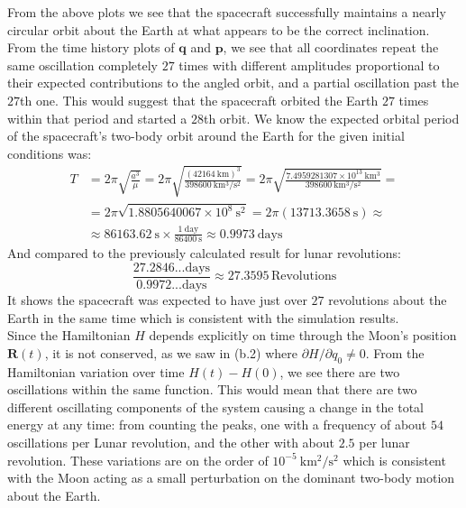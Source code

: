 \documentclass[titlepage]{article}
\begin{document}
\begin{mdframed}[linewidth=1pt, innertopmargin=10pt, innerbottommargin=10pt]
	From the above plots we see that the spacecraft successfully maintains a nearly circular orbit about the Earth at what appears to be the correct inclination. \\
	
	From the time history plots of $\boldsymbol{q}$ and $\boldsymbol{p}$, we see that all coordinates repeat the same oscillation completely $27$ times with different amplitudes proportional to their expected contributions to the angled orbit, and a partial oscillation past the $27$th one. This would suggest that the spacecraft orbited the Earth $27$ times within that period and started a $28$th orbit. We know the expected orbital period of the spacecraft's two-body orbit around the Earth for the given initial conditions was:
	\begin{equation}
		\begin{split}
			T&=2\pi\sqrt{\frac{a^3}{\mu}}=2\pi\sqrt{\frac{(42164\ \mathrm{km})^3}{398600\ \mathrm{km^3/s^2}}}=2\pi\sqrt{\frac{7.4959281307\times10^{13}\ \mathrm{km^3}}{398600\ \mathrm{km^3/s^2}}}= \\
			&=2\pi\sqrt{1.8805640067\times10^{8}\ \mathrm{s^2}}=2\pi\left(13713.3658\ \mathrm{s}\right)\approx \\
			&\approx86163.62\ \mathrm{s}\times\frac{1\ \mathrm{day}}{86400\ \mathrm{s}}\approx0.9973\ \mathrm{days}
		\end{split}
	\end{equation}
	And compared to the previously calculated result for lunar revolutions:
	\begin{equation}
		\frac{27.2846...\mathrm{days}}{0.9972...\mathrm{days}}\approx27.3595\,\mathrm{Revolutions}
	\end{equation}
	It shows the spacecraft was expected to have just over $27$ revolutions about the Earth in the same time which is consistent with the simulation results. \\
	
	Since the Hamiltonian $H$ depends explicitly on time through the Moon's position $\boldsymbol{R}(t)$, it is not conserved, as we saw in (b.2) where $\partial H/\partial q_0\neq0$. From the Hamiltonian variation over time $H(t)-H(0)$, we see there are two oscillations within the same function. This would mean that there are two different oscillating components of the system causing a change in the total energy at any time: from counting the peaks, one with a frequency of about $54$ oscillations per Lunar revolution, and the other with about $2.5$ per lunar revolution. These variations are on the order of $10^{-5}\ \mathrm{km^2/s^2}$ which is consistent with the Moon acting as a small perturbation on the dominant two-body motion about the Earth. \\
	

\end{mdframed}
\end{document}

